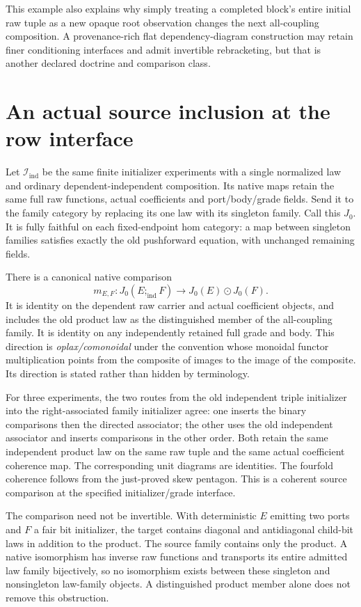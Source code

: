 \documentclass[11pt]{article}
\begin{document}
This example also explains why simply treating a completed block's entire initial raw tuple as a new opaque root observation changes the next all-coupling composition. A provenance-rich flat dependency-diagram construction may retain finer conditioning interfaces and admit invertible rebracketing, but that is another declared doctrine and comparison class.

\section{An actual source inclusion at the row interface}
Let $\mathcal I_{\mathrm{ind}}$ be the same finite initializer experiments with a single normalized law and ordinary dependent-independent composition. Its native maps retain the same full raw functions, actual coefficients and port/body/grade fields. Send it to the family category by replacing its one law with its singleton family. Call this $J_0$. It is fully faithful on each fixed-endpoint hom category: a map between singleton families satisfies exactly the old pushforward equation, with unchanged remaining fields.

There is a canonical native comparison
\[
 m_{E,F}:J_0(E;_{\mathrm{ind}}F)\longrightarrow
                      J_0(E)\odot J_0(F).
\]
It is identity on the dependent raw carrier and actual coefficient objects, and includes the old product law as the distinguished member of the all-coupling family. It is identity on any independently retained full grade and body. This direction is \emph{oplax/comonoidal} under the convention whose monoidal functor multiplication points from the composite of images to the image of the composite. Its direction is stated rather than hidden by terminology.

For three experiments, the two routes from the old independent triple initializer into the right-associated family initializer agree: one inserts the binary comparisons then the directed associator; the other uses the old independent associator and inserts comparisons in the other order. Both retain the same independent product law on the same raw tuple and the same actual coefficient coherence map. The corresponding unit diagrams are identities. The fourfold coherence follows from the just-proved skew pentagon. This is a coherent source comparison at the specified initializer/grade interface.

The comparison need not be invertible. With deterministic $E$ emitting two ports and $F$ a fair bit initializer, the target contains diagonal and antidiagonal child-bit laws in addition to the product. The source family contains only the product. A native isomorphism has inverse raw functions and transports its entire admitted law family bijectively, so no isomorphism exists between these singleton and nonsingleton law-family objects. A distinguished product member alone does not remove this obstruction.
\end{document}
